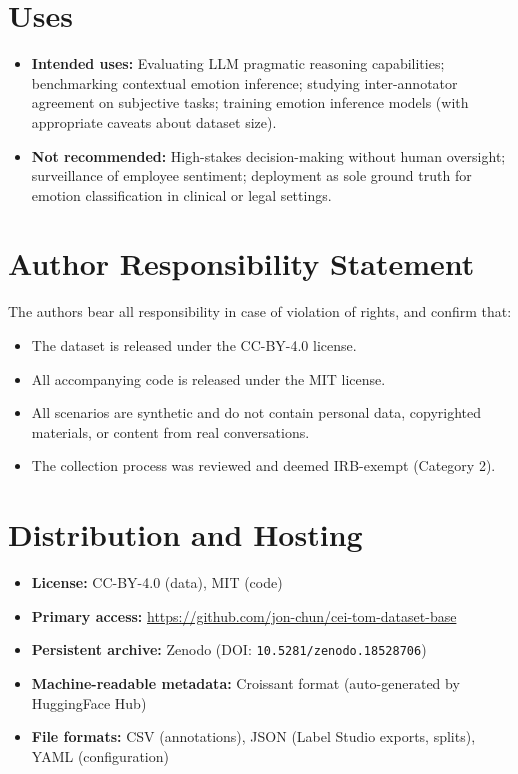 \documentclass[11pt]{article}
\begin{document}
\section{Uses}

\begin{itemize}[leftmargin=*]
    \item \textbf{Intended uses:} Evaluating LLM pragmatic reasoning capabilities; benchmarking contextual emotion inference; studying inter-annotator agreement on subjective tasks; training emotion inference models (with appropriate caveats about dataset size).
    \item \textbf{Not recommended:} High-stakes decision-making without human oversight; surveillance of employee sentiment; deployment as sole ground truth for emotion classification in clinical or legal settings.
\end{itemize}

\section{Author Responsibility Statement}

The authors bear all responsibility in case of violation of rights, and confirm that:
\begin{itemize}[leftmargin=*]
    \item The dataset is released under the CC-BY-4.0 license.
    \item All accompanying code is released under the MIT license.
    \item All scenarios are synthetic and do not contain personal data, copyrighted materials, or content from real conversations.
    \item The collection process was reviewed and deemed IRB-exempt (Category 2).
\end{itemize}

\section{Distribution and Hosting}

\begin{itemize}[leftmargin=*]
    \item \textbf{License:} CC-BY-4.0 (data), MIT (code)
    \item \textbf{Primary access:} \url{https://github.com/jon-chun/cei-tom-dataset-base}
    \item \textbf{Persistent archive:} Zenodo (DOI: \texttt{10.5281/zenodo.18528706})
    \item \textbf{Machine-readable metadata:} Croissant format (auto-generated by HuggingFace Hub)
    \item \textbf{File formats:} CSV (annotations), JSON (Label Studio exports, splits), YAML (configuration)
\end{itemize}
\end{document}
